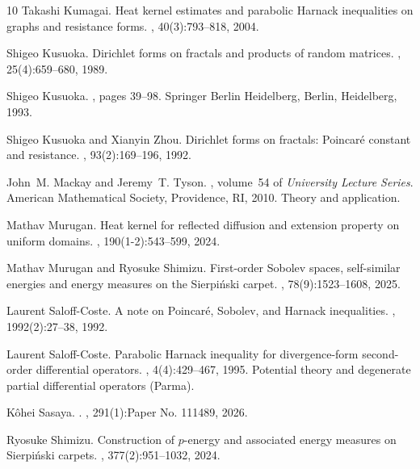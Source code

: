 \documentclass[11pt,a4paper]{article}
\numberwithin{equation}{section}
\theoremstyle{plain}
\theoremstyle{definition}
\begin{document}
\begin{thebibliography}{10}
Takashi Kumagai.
\newblock Heat kernel estimates and parabolic {H}arnack inequalities on graphs
  and resistance forms.
, 40(3):793--818, 2004.

Shigeo Kusuoka.
\newblock Dirichlet forms on fractals and products of random matrices.
, 25(4):659--680, 1989.

Shigeo Kusuoka.
, pages
  39--98.
\newblock Springer Berlin Heidelberg, Berlin, Heidelberg, 1993.

Shigeo Kusuoka and Xianyin Zhou.
\newblock Dirichlet forms on fractals: {P}oincar\'{e} constant and resistance.
, 93(2):169--196, 1992.

John~M. Mackay and Jeremy~T. Tyson.
, volume~54 of {\em University Lecture
  Series}.
\newblock American Mathematical Society, Providence, RI, 2010.
\newblock Theory and application.

Mathav Murugan.
\newblock Heat kernel for reflected diffusion and extension property on uniform
  domains.
, 190(1-2):543--599, 2024.

Mathav Murugan and Ryosuke Shimizu.
\newblock First-order {S}obolev spaces, self-similar energies and energy
  measures on the {S}ierpi\'nski carpet.
, 78(9):1523--1608, 2025.

Laurent Saloff-Coste.
\newblock A note on {P}oincar\'{e}, {S}obolev, and {H}arnack inequalities.
, 1992(2):27--38, 1992.

Laurent Saloff-Coste.
\newblock Parabolic {H}arnack inequality for divergence-form second-order
  differential operators.
, 4(4):429--467, 1995.
\newblock Potential theory and degenerate partial differential operators
  (Parma).

K{\^o}hei {Sasaya}.
.
, 291(1):Paper No. 111489, 2026.

Ryosuke Shimizu.
\newblock Construction of {$p$}-energy and associated energy measures on
  {S}ierpi\'{n}ski carpets.
, 377(2):951--1032, 2024.


\end{thebibliography}
\end{document}
